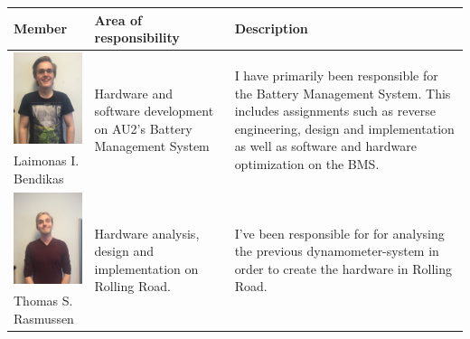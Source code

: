 \newpage
\begin{tabular}[c]{|p{3cm}| p{5cm} | p{6cm}|}
	\hline
	\textbf{Member} & \textbf{Area of responsibility} & \textbf{Description}\\\hline
	
	\phantom{Test}
	\includegraphics[width=3cm]{Introduction/TeamPictures/Laimonas} & \multirow{2}{5cm}{Hardware and software development on AU2's Battery Management System} & \multirow{2}{6cm}{I have primarily been responsible for the Battery Management System. This includes assignments such as reverse engineering, design and implementation as well as software and hardware optimization on the BMS.} \\
	Laimonas I. \newline Bendikas & & \\ \hline
		
	\phantom{Test}
	\includegraphics[width=3cm]{Introduction/TeamPictures/ThomasR} & \multirow{2}{5cm}{Hardware analysis, design and implementation on Rolling Road.} & \multirow{2}{6cm}{I've been responsible for for analysing the previous dynamometer-system in order to create the hardware in Rolling Road.} \\
	Thomas S. \newline Rasmussen & & \\ \hline
		

\end{tabular}
